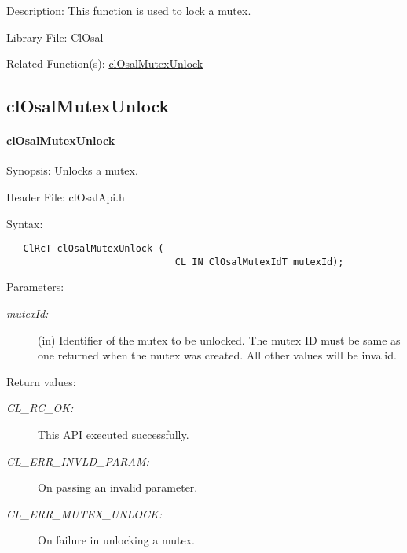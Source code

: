 \begin{Desc}
\item[Description:]This function is used to lock a mutex.\end{Desc}
\begin{Desc}
\item[Library File:]Cl\-Osal\end{Desc}
\begin{Desc}
\item[Related Function(s):]\hyperlink{pageosal114}{cl\-Osal\-Mutex\-Unlock} \end{Desc}

\newpage

\subsection{clOsalMutexUnlock}
\hypertarget{pageosal114}{}\paragraph{cl\-Osal\-Mutex\-Unlock}\label{pageosal114}
\begin{Desc}
\item[Synopsis:]Unlocks a mutex.\end{Desc}
\begin{Desc}
\item[Header File:]clOsalApi.h\end{Desc}
\begin{Desc}
\item[Syntax:]

\footnotesize\begin{verbatim}   ClRcT clOsalMutexUnlock (
                              CL_IN ClOsalMutexIdT mutexId);
\end{verbatim}
\normalsize
\end{Desc}
\begin{Desc}
\item[Parameters:]
\begin{description}
\item[{\em mutex\-Id:}](in) Identifier of the mutex to be unlocked. The mutex ID must be same as one returned when the mutex was created. All other values will be invalid.\end{description}
\end{Desc}
\begin{Desc}
\item[Return values:]
\begin{description}
\item[{\em CL\_\-RC\_\-OK:}]This API executed successfully. \item[{\em CL\_\-ERR\_\-INVLD\_\-PARAM:}]On passing an invalid parameter. \item[{\em CL\_\-ERR\_\-MUTEX\_\-UNLOCK:}]On failure in unlocking a mutex.\end{description}
\end{Desc}
